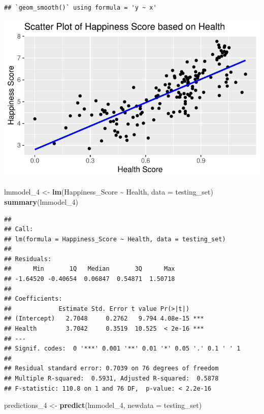 \documentclass[
  11pt,
]{article}
\newenvironment{Shaded}{\begin{snugshade}}{\end{snugshade}}
\newcommand{\AttributeTok}[1]{\textcolor[rgb]{0.13,0.29,0.53}{#1}}
\newcommand{\FunctionTok}[1]{\textcolor[rgb]{0.13,0.29,0.53}{\textbf{#1}}}
\newcommand{\NormalTok}[1]{#1}
\newcommand{\OtherTok}[1]{\textcolor[rgb]{0.56,0.35,0.01}{#1}}
\newcommand{\SpecialCharTok}[1]{\textcolor[rgb]{0.81,0.36,0.00}{\textbf{#1}}}
\begin{document}
\begin{verbatim}
## `geom_smooth()` using formula = 'y ~ x'
\end{verbatim}

\begin{center}\includegraphics[width=0.7\linewidth]{Group_project_2_files/figure-latex/unnamed-chunk-58-1} \end{center}

\begin{Shaded}
\begin{Highlighting}[]
\NormalTok{lmmodel\_4 }\OtherTok{\textless{}{-}} \FunctionTok{lm}\NormalTok{(Happiness\_Score }\SpecialCharTok{\textasciitilde{}}\NormalTok{ Health, }\AttributeTok{data =}\NormalTok{ testing\_set)}
\FunctionTok{summary}\NormalTok{(lmmodel\_4)}
\end{Highlighting}
\end{Shaded}

\begin{verbatim}
## 
## Call:
## lm(formula = Happiness_Score ~ Health, data = testing_set)
## 
## Residuals:
##      Min       1Q   Median       3Q      Max 
## -1.64520 -0.40654  0.06847  0.54871  1.50718 
## 
## Coefficients:
##             Estimate Std. Error t value Pr(>|t|)    
## (Intercept)   2.7048     0.2762   9.794 4.08e-15 ***
## Health        3.7042     0.3519  10.525  < 2e-16 ***
## ---
## Signif. codes:  0 '***' 0.001 '**' 0.01 '*' 0.05 '.' 0.1 ' ' 1
## 
## Residual standard error: 0.7039 on 76 degrees of freedom
## Multiple R-squared:  0.5931, Adjusted R-squared:  0.5878 
## F-statistic: 110.8 on 1 and 76 DF,  p-value: < 2.2e-16
\end{verbatim}

\begin{Shaded}
\begin{Highlighting}[]
\NormalTok{predictions\_4 }\OtherTok{\textless{}{-}} \FunctionTok{predict}\NormalTok{(lmmodel\_4, }\AttributeTok{newdata =}\NormalTok{ testing\_set)}
\end{Highlighting}
\end{Shaded}
\end{document}

